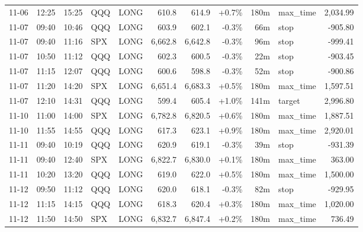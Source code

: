 \documentclass[11pt,a4paper,twoside]{article}
\begin{document}
\begin{center}
\begin{longtable}{>{\color{txtmain}}l l l l l r r r r >{\color{txtmain}}l r}
11-06 & 12:25 & 15:25 & QQQ & LONG & 610.8 & 614.9 & \textcolor{wingreen}{+0.7\%} & 180m & max\_time & \textcolor{wingreen}{2,034.99} \\
11-07 & 09:40 & 10:46 & QQQ & LONG & 603.9 & 602.1 & \textcolor{lossred}{-0.3\%} & 66m & stop & \textcolor{lossred}{-905.80} \\
11-07 & 09:40 & 11:16 & SPX & LONG & 6,662.8 & 6,642.8 & \textcolor{lossred}{-0.3\%} & 96m & stop & \textcolor{lossred}{-999.41} \\
11-07 & 10:50 & 11:12 & QQQ & LONG & 602.3 & 600.5 & \textcolor{lossred}{-0.3\%} & 22m & stop & \textcolor{lossred}{-903.45} \\
11-07 & 11:15 & 12:07 & QQQ & LONG & 600.6 & 598.8 & \textcolor{lossred}{-0.3\%} & 52m & stop & \textcolor{lossred}{-900.86} \\
11-07 & 11:20 & 14:20 & SPX & LONG & 6,651.4 & 6,683.3 & \textcolor{wingreen}{+0.5\%} & 180m & max\_time & \textcolor{wingreen}{1,597.51} \\
11-07 & 12:10 & 14:31 & QQQ & LONG & 599.4 & 605.4 & \textcolor{wingreen}{+1.0\%} & 141m & target & \textcolor{wingreen}{2,996.80} \\
11-10 & 11:00 & 14:00 & SPX & LONG & 6,782.8 & 6,820.5 & \textcolor{wingreen}{+0.6\%} & 180m & max\_time & \textcolor{wingreen}{1,887.51} \\
11-10 & 11:55 & 14:55 & QQQ & LONG & 617.3 & 623.1 & \textcolor{wingreen}{+0.9\%} & 180m & max\_time & \textcolor{wingreen}{2,920.01} \\
11-11 & 09:40 & 10:19 & QQQ & LONG & 620.9 & 619.1 & \textcolor{lossred}{-0.3\%} & 39m & stop & \textcolor{lossred}{-931.39} \\
11-11 & 09:40 & 12:40 & SPX & LONG & 6,822.7 & 6,830.0 & \textcolor{wingreen}{+0.1\%} & 180m & max\_time & \textcolor{wingreen}{363.00} \\
11-11 & 10:20 & 13:20 & QQQ & LONG & 619.0 & 622.0 & \textcolor{wingreen}{+0.5\%} & 180m & max\_time & \textcolor{wingreen}{1,500.00} \\
11-12 & 09:50 & 11:12 & QQQ & LONG & 620.0 & 618.1 & \textcolor{lossred}{-0.3\%} & 82m & stop & \textcolor{lossred}{-929.95} \\
11-12 & 11:15 & 14:15 & QQQ & LONG & 618.3 & 620.4 & \textcolor{wingreen}{+0.3\%} & 180m & max\_time & \textcolor{wingreen}{1,020.00} \\
11-12 & 11:50 & 14:50 & SPX & LONG & 6,832.7 & 6,847.4 & \textcolor{wingreen}{+0.2\%} & 180m & max\_time & \textcolor{wingreen}{736.49} \\

\end{longtable}
\end{center}
\end{document}
